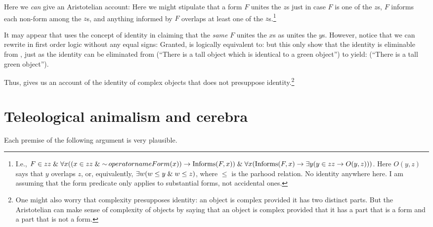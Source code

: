 Here we \textit{can} give an Aristotelian account:
Here we might stipulate that a form $F$ unites the $z$s just in case $F$ is one of 
the $z$s, $F$ informs each non-form among the $z$s, and anything informed 
by $F$ overlaps at least one of the $z$s.\footnote{I.e., 
$F\in zz\mathrel{\&} \forall x((x \in zz \mathrel{\&}\operatorname{\sim} operatorname{Form}(x)) \rightarrow 
\operatorname{Informs}(F,x))\mathrel{\&}\forall x(\operatorname{Informs}(F,x)\rightarrow
\exists y(y\in zz \rightarrow O(y,z)))$. Here $O(y,z)$ says that $y$ overlaps $z$,
or, equivalently, $\exists w(w\le y\mathrel{\&} w\le z)$, where $\le$ is the parhood
relation. No identity anywhere here. I am assuming that the form predicate
only applies to substantial forms, not accidental ones.}

It may appear that  uses the concept of identity in claiming 
that the \textit{same} $F$ unites the $x$s as unites the $y$s. However, notice that
we can rewrite  in first order logic without any equal signs:
Granted,  is logically equivalent to:
but this only show that the identity is eliminable from ,
just as the identity can be eliminated from
(``There is a tall object which is identical to a green object'') to yield:
(``There is a tall green object'').

Thus,  gives us an account of the identity of complex objects
that does not presuppose identity.\footnote{One might also worry that complexity
presupposes identity: an object is complex provided it has two distinct parts.
But the Aristotelian can make sense of complexity of objects by saying that an
object is complex provided that it has a part that is a form and a part that is not
a form.}

\section{Teleological animalism and cerebra}
Each premise of the following argument is very plausible.

